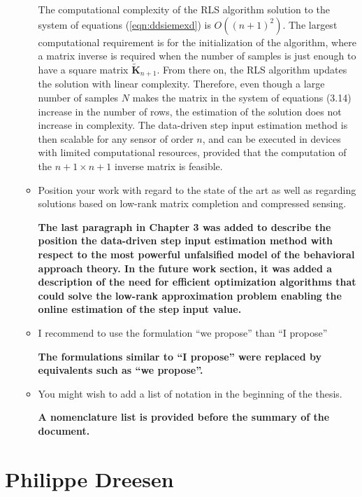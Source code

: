 \documentclass[11pt]{article}
\begin{document}
\begin{itemize}
\begin{itemize}
	\color{blue}
    The computational complexity of the RLS algorithm solution to the system of equations (\ref{eqn:ddsiemexd}) is $O \left( \left( n+1 \right)^2 \right)$.
    The largest computational requirement is for the initialization of the algorithm, where a matrix inverse is required when the number of samples is just enough to have a square matrix $\widetilde{\mathbf{K}}_{n+1}$.
    From there on, the RLS algorithm updates the solution with linear complexity.
    Therefore, even though a large number of samples $N$ makes the matrix in the system of equations (3.14) increase in the number of rows, the estimation of the solution does not increase in complexity. 
    The data-driven step input estimation method is then scalable for any sensor of order $n$, and can be executed in devices with limited computational resources, provided that the computation of the  $n+1 \times n+1$ inverse matrix is feasible.
    \color{black}
	
	\item Position your work with regard to the state of the art as well as regarding solutions based on low-rank matrix completion and compressed sensing.
	
    {\bfseries The last paragraph in Chapter 3 was added to describe the position the data-driven step input estimation method with respect to the most powerful unfalsified model of the behavioral approach theory. In the future work section, it was added a description of the need for efficient optimization algorithms that could solve the low-rank approximation problem enabling the online estimation of the step input value. }

	\item I recommend to use the formulation “we propose” than “I propose”
	
	{\bfseries The formulations similar to “I propose” were replaced by equivalents such as “we propose”. }
	
	\item You might wish to add a list of notation in the beginning of the thesis.
	
	{\bfseries A nomenclature list is provided before the summary of the document. }
	
	\end{itemize}
\end{itemize}

\section*{Philippe Dreesen}
\end{document}
